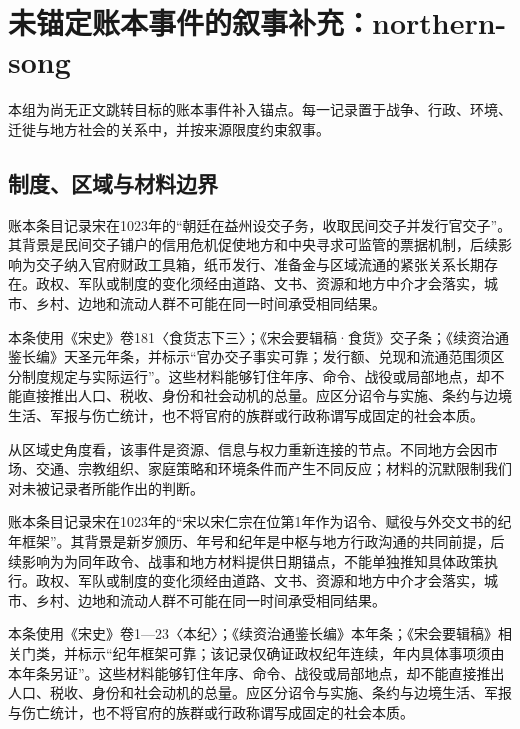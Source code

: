 \section{未锚定账本事件的叙事补充：northern-song}

\label{sec:anchor-batch-two-northern-song}

本组为尚无正文跳转目标的账本事件补入锚点。每一记录置于战争、行政、环境、迁徙与地方社会的关系中，并按来源限度约束叙事。

\subsection{制度、区域与材料边界}

账本条目记录宋在1023年的“朝廷在益州设交子务，收取民间交子并发行官交子”。其背景是民间交子铺户的信用危机促使地方和中央寻求可监管的票据机制，后续影响为交子纳入官府财政工具箱，纸币发行、准备金与区域流通的紧张关系长期存在。政权、军队或制度的变化须经由道路、文书、资源和地方中介才会落实，城市、乡村、边地和流动人群不可能在同一时间承受相同结果。

本条使用《宋史》卷181〈食货志下三〉；《宋会要辑稿·食货》交子条；《续资治通鉴长编》天圣元年条，并标示“官办交子事实可靠；发行额、兑现和流通范围须区分制度规定与实际运行”。这些材料能够钉住年序、命令、战役或局部地点，却不能直接推出人口、税收、身份和社会动机的总量。应区分诏令与实施、条约与边境生活、军报与伤亡统计，也不将官府的族群或行政称谓写成固定的社会本质。

从区域史角度看，该事件是资源、信息与权力重新连接的节点。不同地方会因市场、交通、宗教组织、家庭策略和环境条件而产生不同反应；材料的沉默限制我们对未被记录者所能作出的判断。

账本条目记录宋在1023年的“宋以宋仁宗在位第1年作为诏令、赋役与外交文书的纪年框架”。其背景是新岁颁历、年号和纪年是中枢与地方行政沟通的共同前提，后续影响为为同年政令、战事和地方材料提供日期锚点，不能单独推知具体政策执行。政权、军队或制度的变化须经由道路、文书、资源和地方中介才会落实，城市、乡村、边地和流动人群不可能在同一时间承受相同结果。

本条使用《宋史》卷1—23〈本纪〉；《续资治通鉴长编》本年条；《宋会要辑稿》相关门类，并标示“纪年框架可靠；该记录仅确证政权纪年连续，年内具体事项须由本年条另证”。这些材料能够钉住年序、命令、战役或局部地点，却不能直接推出人口、税收、身份和社会动机的总量。应区分诏令与实施、条约与边境生活、军报与伤亡统计，也不将官府的族群或行政称谓写成固定的社会本质。

